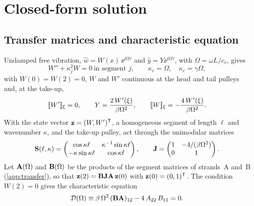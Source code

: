 \section{Closed-form solution}\label{sec:solution}

\subsection{Transfer matrices and characteristic equation}\label{sec:eigen}

Undamped free vibration, $\hat w=W(x)\,\ee^{\ii\Omega\tau}$ and
$\hat y=Y\ee^{\ii\Omega\tau}$, with $\Omega=\omega L/c_r$, gives
\begin{equation}\label{eq:eigen}
  W''+\kappa_j^2W=0\ \text{in segment } j,\qquad \kappa_r=\Omega,\quad \kappa_c=\gamma\Omega,
\end{equation}
with $W(0)=W(2)=0$, $W$ and $W'$ continuous at the head and tail pulleys and, at the take-up,
\begin{equation}\label{eq:eigen_tu}
  [\![W']\!]_\xi=0,\qquad Y=\frac{2\,W'(\xi)}{\beta\Omega^2},\qquad
  [\![W]\!]_\xi=-\frac{4\,W'(\xi)}{\beta\Omega^2}.
\end{equation}
With the state vector $\mathbf{z}=(W,W')^{\mathsf{T}}$, a homogeneous segment of length $\ell$ and
wavenumber $\kappa$, and the take-up pulley, act through the unimodular matrices
\begin{equation}\label{eq:transfer}
  \mathbf{S}(\ell,\kappa)=\begin{pmatrix}\cos\kappa\ell&\kappa^{-1}\sin\kappa\ell\\
  -\kappa\sin\kappa\ell&\cos\kappa\ell\end{pmatrix},\qquad
  \mathbf{J}=\begin{pmatrix}1&-4/(\beta\Omega^2)\\0&1\end{pmatrix}.
\end{equation}
Let $\mathbf{A}(\Omega)$ and $\mathbf{B}(\Omega)$ be the products of the segment matrices of
strands~A and~B (\cref{app:transfer}), so that $\mathbf{z}(2)=\mathbf{B}\mathbf{J}\mathbf{A}\,\mathbf{z}(0)$
with $\mathbf{z}(0)=(0,1)^{\mathsf{T}}$. The condition $W(2)=0$ gives the characteristic equation
\begin{equation}\label{eq:chareq}
  \mathcal D(\Omega)\equiv\beta\,\Omega^2\,(\mathbf{B}\mathbf{A})_{12}-4\,A_{22}\,B_{11}=0 .
\end{equation}
